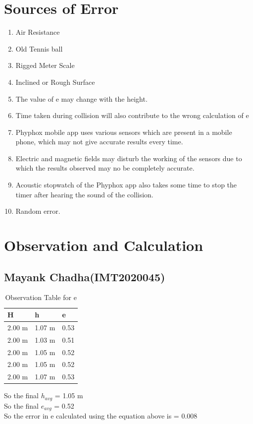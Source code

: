 \documentclass[11pt]{scrartcl} %
\begin{document}
\section{Sources of Error}
\begin{enumerate}
	\item Air Resistance
	\item Old Tennis ball
	\item Rigged Meter Scale
	\item Inclined or Rough Surface
	\item The value of e may change with the height.
	\item Time taken during collision will also contribute to the wrong calculation of e
	\item Phyphox mobile app uses various sensors which are present in a mobile phone, which may not give accurate results every time.
	\item Electric and magnetic fields may disturb the working of the sensors due to which the results observed may no be completely accurate.
	\item Acoustic stopwatch of the Phyphox app also takes some time to stop the timer after hearing the sound of the collision.
	\item Random error.
\end{enumerate}
\newpage

\section{Observation and Calculation}
\subsection{Mayank Chadha(IMT2020045)}

\begin{table}[h] %
	\centering %
	\begin{tabular}{l l l}
		\toprule
		\textbf{H} & \textbf{h} & \textbf{e} \\
		\midrule
		2.00 m & 1.07 m & 0.53\\
        2.00 m & 1.03 m & 0.51\\
        2.00 m & 1.05 m & 0.52\\
        2.00 m & 1.05 m & 0.52\\
        2.00 m & 1.07 m & 0.53\\
		\bottomrule
	\end{tabular}
	\caption{Observation Table for e}
\end{table}
So the final $h_{avg}$ = 1.05 m\\
So the final $e_{avg}$ = 0.52\\
So the error in e calculated using the equation above is  = 0.008 
\end{document}

